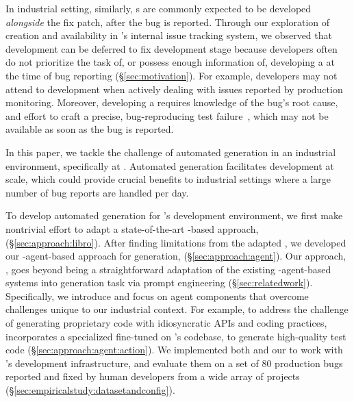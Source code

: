 In industrial setting, similarly, \brt{}s are commonly expected to be developed \textit{alongside} the fix patch, after the bug is reported.
Through our exploration of \brt creation and \brt availability in \google's internal issue tracking system\Space{ (\gits)}, we observed that \brt development can be deferred to fix development stage because developers often do not prioritize the task of, or possess enough information of, developing a \brt at the time of bug reporting (\S\ref{sec:motivation}).
For example, developers may not attend to \brt development when actively dealing with issues reported by production monitoring.
Moreover, developing a \brt requires knowledge of the bug's root cause, and effort to craft a precise, bug-reproducing test failure~\cite{grottke2007fighting,just2018comparing,beller2018dichotomy}, which may not be available as soon as the bug is reported. 

In this paper, we tackle the challenge of automated \brt generation in an industrial environment, specifically at \google.
Automated \brt generation facilitates \brt development at scale, which could provide crucial benefits to industrial settings where a large number of bug reports are handled per day.

To develop automated \brt generation for \google's development environment, we first make nontrivial effort to adapt a state-of-the-art \llm-based approach, \libro~\cite{kang2023large} (\S\ref{sec:approach:libro}).
After finding limitations from the adapted \libro, we developed our \llm-agent-based approach for \brt generation, \tool (\S\ref{sec:approach:agent}).
Our approach, \tool, goes beyond being a straightforward adaptation of the existing \llm-agent-based \autopr systems into \brt generation task via \llm prompt engineering (\S\ref{sec:relatedwork}).
Specifically, we introduce and focus on agent components that overcome challenges unique to our industrial context. 
For example, to address the challenge of generating proprietary code with idiosyncratic APIs and coding practices, \tool incorporates a specialized \codeeditingllm fine-tuned on \google's codebase, to generate high-quality test code (\S\ref{sec:approach:agent:action}).
We implemented both \libro and our \tool to work with \google's development infrastructure, and evaluate them on a set of 80 production bugs reported and fixed by human developers from a wide array of \google projects~\cite{rondon2025passerine} (\S\ref{sec:empiricalstudy:datasetandconfig}).


